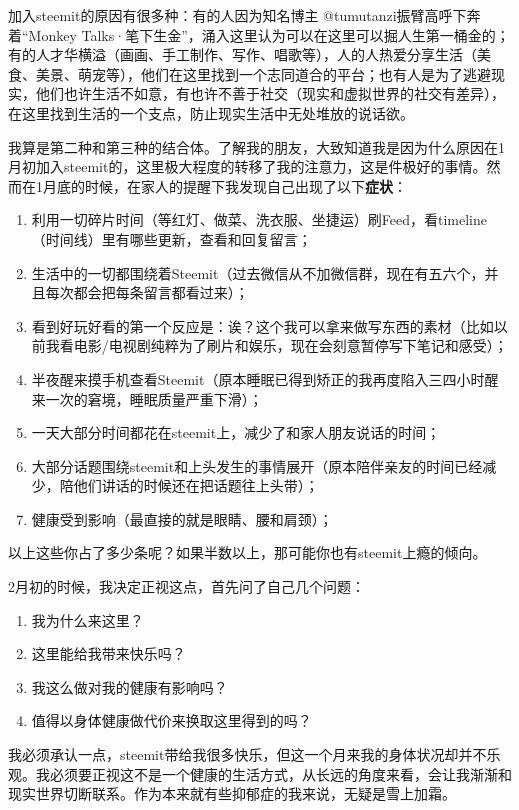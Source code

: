 \documentclass[]{ctexbook}
\begin{document}
加入steemit的原因有很多种：有的人因为知名博主 @tumutanzi振臂高呼下奔着``Monkey Talks·笔下生金''，涌入这里认为可以在这里可以掘人生第一桶金的；有的人才华横溢（画画、手工制作、写作、唱歌等），人的人热爱分享生活（美食、美景、萌宠等），他们在这里找到一个志同道合的平台；也有人是为了逃避现实，他们也许生活不如意，有也许不善于社交（现实和虚拟世界的社交有差异），在这里找到生活的一个支点，防止现实生活中无处堆放的说话欲。

我算是第二种和第三种的结合体。了解我的朋友，大致知道我是因为什么原因在1月初加入steemit的，这里极大程度的转移了我的注意力，这是件极好的事情。然而在1月底的时候，在家人的提醒下我发现自己出现了以下\textbf{症状}：

\begin{enumerate}
\def\labelenumi{\arabic{enumi}.}
\item
  利用一切碎片时间（等红灯、做菜、洗衣服、坐捷运）刷Feed，看timeline（时间线）里有哪些更新，查看和回复留言；
\item
  生活中的一切都围绕着Steemit（过去微信从不加微信群，现在有五六个，并且每次都会把每条留言都看过来）；
\item
  看到好玩好看的第一个反应是：诶？这个我可以拿来做写东西的素材（比如以前我看电影/电视剧纯粹为了刷片和娱乐，现在会刻意暂停写下笔记和感受）；
\item
  半夜醒来摸手机查看Steemit（原本睡眠已得到矫正的我再度陷入三四小时醒来一次的窘境，睡眠质量严重下滑）；
\item
  一天大部分时间都花在steemit上，减少了和家人朋友说话的时间；
\item
  大部分话题围绕steemit和上头发生的事情展开（原本陪伴亲友的时间已经减少，陪他们讲话的时候还在把话题往上头带）；
\item
  健康受到影响（最直接的就是眼睛、腰和肩颈）；
\end{enumerate}

以上这些你占了多少条呢？如果半数以上，那可能你也有steemit上瘾的倾向。

2月初的时候，我决定正视这点，首先问了自己几个问题：

\begin{enumerate}
\def\labelenumi{\arabic{enumi}.}
\item
  我为什么来这里？
\item
  这里能给我带来快乐吗？
\item
  我这么做对我的健康有影响吗？
\item
  值得以身体健康做代价来换取这里得到的吗？
\end{enumerate}

我必须承认一点，steemit带给我很多快乐，但这一个月来我的身体状况却并不乐观。我必须要正视这不是一个健康的生活方式，从长远的角度来看，会让我渐渐和现实世界切断联系。作为本来就有些抑郁症的我来说，无疑是雪上加霜。
\end{document}
